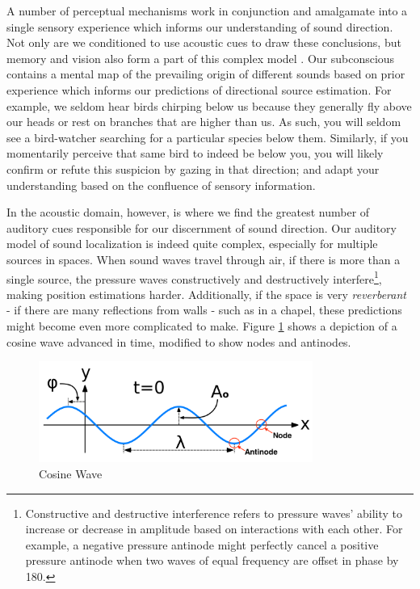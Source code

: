 A number of perceptual mechanisms work in conjunction and amalgamate into a single sensory experience which informs our understanding of sound direction. Not only are we conditioned to use acoustic cues to draw these conclusions, but memory and vision also form a part of this complex model \cite{kendall19953}. Our subconscious contains a mental map of the prevailing origin of different sounds based on prior experience which informs our predictions of directional source estimation. For example, we seldom hear birds chirping below us because they generally fly above our heads or rest on branches that are higher than us. As such, you will seldom see a bird-watcher searching for a particular species below them. Similarly, if you momentarily perceive that same bird to indeed be below you, you will likely confirm or refute this suspicion by gazing in that direction; and adapt your understanding based on the confluence of sensory information. 

In the acoustic domain, however, is where we find the greatest number of auditory cues responsible for our discernment of sound direction. Our auditory model of sound localization is indeed quite complex, especially for multiple sources in spaces. When sound waves travel through air, if there is more than a single source, the pressure waves constructively and destructively interfere\footnote{Constructive and destructive interference refers to pressure waves' ability to increase or decrease in amplitude based on interactions with each other. For example, a negative pressure antinode might perfectly cancel a positive pressure antinode when two waves of equal frequency are offset in phase by 180\textdegree.}, making position estimations harder. Additionally, if the space is very \textit{reverberant} - if there are many reflections from walls - such as in a chapel, these predictions might become even more complicated to make. Figure \ref{fig:cosine-wave} shows a depiction of a cosine wave advanced in time, modified to show nodes and antinodes.

\begin{figure}[ht!]%
\centering
\includegraphics[width=0.8\textwidth]{img/cosine-wave.png} 
\caption{Cosine Wave \cite{FileWave97:online}}
\label{fig:cosine-wave}
\end{figure}

